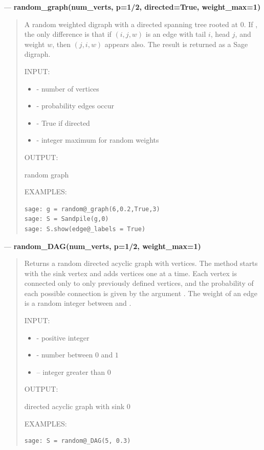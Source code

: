 \documentclass[letterpaper,10pt,english]{manual}
\begin{document}
---
\hypertarget{random-graph-num-verts-p-directed-weight-max}{}
\textbf{random\_graph(num\_verts, p=1/2, directed=True, weight\_max=1)}
\begin{quote}

A random weighted digraph with a directed spanning tree rooted at $0$.  If
, the only difference is that if $(i,j,w)$ is an edge with
tail $i$, head $j$, and weight $w$, then $(j,i,w)$ appears also.  The result
is returned as a Sage digraph.

INPUT:
\begin{itemize}
\item {} 
 - number of vertices

\item {} 
 - probability edges occur

\item {} 
 - True if directed

\item {} 
 - integer maximum for random weights

\end{itemize}

OUTPUT:

random graph

EXAMPLES:

\begin{Verbatim}[commandchars=@\[\]]
sage: g = random@_graph(6,0.2,True,3)
sage: S = Sandpile(g,0)
sage: S.show(edge@_labels = True)
\end{Verbatim}
\end{quote}

---
\hypertarget{random-dag-num-verts-p-weight-max}{}
\textbf{random\_DAG(num\_verts, p=1/2, weight\_max=1)}
\begin{quote}

Returns a random directed acyclic graph with  vertices.
The method starts with the sink vertex and adds vertices one at a time.
Each vertex is connected only to only previously defined vertices, and the
probability of each possible connection is given by the argument .
The weight of an edge is a random integer between  and
.

INPUT:
\begin{itemize}
\item {} 
 - positive integer

\item {} 
 - number between $0$ and $1$

\item {} 
 -- integer greater than $0$

\end{itemize}

OUTPUT:

directed acyclic graph with sink $0$

EXAMPLES:

\begin{Verbatim}[commandchars=@\[\]]
sage: S = random@_DAG(5, 0.3)
\end{Verbatim}
\end{quote}
\end{document}
